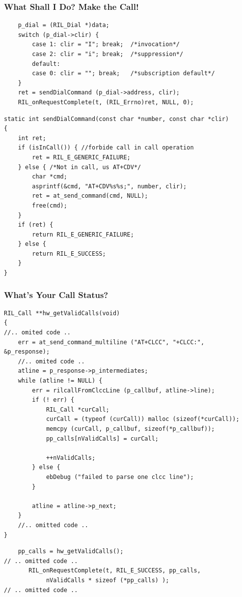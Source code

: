 \documentclass{beamer}
\begin{document}
\begin{frame}[fragile]
    \frametitle{What Shall I Do? Make the Call!}
    \lstset{language=C}
  \begin{lstlisting}
    p_dial = (RIL_Dial *)data;
    switch (p_dial->clir) {
        case 1: clir = "I"; break;  /*invocation*/
        case 2: clir = "i"; break;  /*suppression*/
        default:
        case 0: clir = ""; break;   /*subscription default*/
    }
    ret = sendDialCommand (p_dial->address, clir);
    RIL_onRequestComplete(t, (RIL_Errno)ret, NULL, 0);
  \end{lstlisting}
    \lstset{language=C}
  \begin{lstlisting}
static int sendDialCommand(const char *number, const char *clir)
{
    int ret;
    if (isInCall()) { //forbide call in call operation
        ret = RIL_E_GENERIC_FAILURE;
    } else { /*Not in call, us AT+CDV*/
        char *cmd;
        asprintf(&cmd, "AT+CDV%s%s;", number, clir);
        ret = at_send_command(cmd, NULL);
        free(cmd);
    }
    if (ret) {
        return RIL_E_GENERIC_FAILURE;
    } else {
        return RIL_E_SUCCESS;
    }
}
  \end{lstlisting}
\end{frame}

\begin{frame}[fragile]
    \frametitle{What's Your Call Status?}
    \lstset{language=C}
  \begin{lstlisting}
RIL_Call **hw_getValidCalls(void)
{
//.. omited code ..
    err = at_send_command_multiline ("AT+CLCC", "+CLCC:", &p_response);
    //.. omited code ..
    atline = p_response->p_intermediates;
    while (atline != NULL) {
        err = rilcallFromClccLine (p_callbuf, atline->line);
        if (! err) {
            RIL_Call *curCall;
            curCall = (typeof (curCall)) malloc (sizeof(*curCall));
            memcpy (curCall, p_callbuf, sizeof(*p_callbuf));
            pp_calls[nValidCalls] = curCall;

            ++nValidCalls;
        } else {
            ebDebug ("failed to parse one clcc line");
        }

        atline = atline->p_next;
    }
    //.. omitted code ..
}
  \end{lstlisting}
    \lstset{language=C}
  \begin{lstlisting}
    pp_calls = hw_getValidCalls();
// .. omitted code ..
       RIL_onRequestComplete(t, RIL_E_SUCCESS, pp_calls,
            nValidCalls * sizeof (*pp_calls) );
// .. omitted code ..
  \end{lstlisting}
\end{frame}
\end{document}
